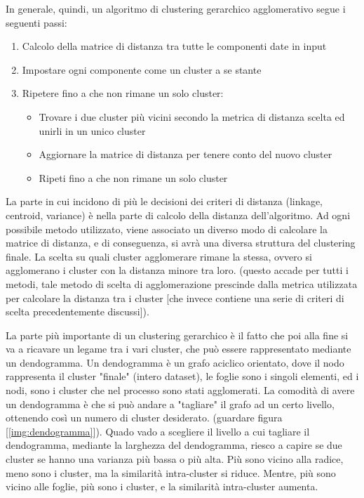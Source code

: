 In generale, quindi, un algoritmo di clustering gerarchico agglomerativo segue i seguenti passi:

\begin{enumerate}
\item Calcolo della matrice di distanza tra tutte le componenti date in input
\item Impostare ogni componente come un cluster a se stante
\item Ripetere fino a che non rimane un solo cluster:
\begin{itemize}
    \item Trovare i due cluster più vicini secondo la metrica di distanza scelta ed unirli in un unico cluster
    \item Aggiornare la matrice di distanza per tenere conto del nuovo cluster
    \item Ripeti fino a che non rimane un solo cluster
\end{itemize}
\end{enumerate}
\clearpage

La parte in cui incidono di più le decisioni dei criteri di distanza (linkage, centroid, variance) è nella parte di calcolo della distanza dell'algoritmo. Ad ogni possibile metodo utilizzato, viene associato un diverso modo di calcolare la matrice di distanza, e di conseguenza, si avrà una diversa struttura del clustering finale.
La scelta su quali cluster agglomerare rimane la stessa, ovvero si agglomerano i cluster con la distanza minore tra loro. (questo accade per tutti i metodi, tale metodo di scelta di agglomerazione prescinde dalla metrica utilizzata per calcolare la distanza tra i cluster [che invece contiene una serie di criteri di scelta precedentemente discussi]).

La parte più importante di un clustering gerarchico è il fatto che poi alla fine si va a ricavare un legame tra i vari cluster, che può essere rappresentato mediante un dendogramma. Un dendogramma è un grafo aciclico orientato, dove il nodo rappresenta il cluster "finale" (intero dataset), le foglie sono i singoli elementi, ed i nodi, sono i cluster che nel processo sono stati agglomerati. La comodità di avere un dendogramma è che si può andare a "tagliare" il grafo ad un certo livello, ottenendo così un numero di cluster desiderato. (guardare figura [\ref{img:dendogramma}]). Quado vado a scegliere il livello a cui tagliare il dendogramma, mediante la larghezza del dendogramma, riesco a capire se due cluster se hanno una varianza più bassa o più alta. Più sono vicino alla radice, meno sono i cluster, ma la similarità intra-cluster si riduce. Mentre, più sono vicino alle foglie, più sono i cluster, e la similarità intra-cluster aumenta. 

